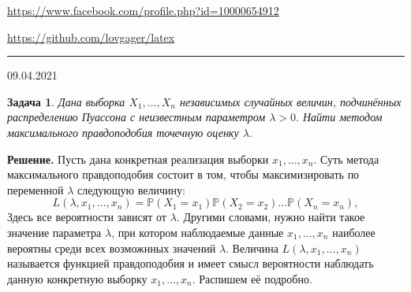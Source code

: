 \documentclass[12pt]{article}
\begin{document}


\begin{flushleft}
\url{https://www.facebook.com/profile.php?id=10000654912}

\url{https://github.com/lovgager/latex}
\end{flushleft}
\hrule 
\begin{flushright}
09.04.2021
\end{flushright}
\bigskip


\newtheorem*{task}{Задача}
\begin{task}
Дана выборка $X_1, ..., X_n$ независимых случайных величин, подчинённых распределению Пуассона с неизвестным параметром $\lambda > 0.$ Найти методом максимального правдоподобия точечную оценку $\lambda$. 
\end{task}

\noindent\textbf{Решение.} 
Пусть дана конкретная реализация выборки $x_1, ..., x_n.$ Суть метода максимального правдоподобия состоит в том, чтобы максимизировать по переменной $\lambda$ следующую величину:
\begin{equation*}
    L(\lambda, x_1, ..., x_n) = \mathbb{P}(X_1=x_1)\mathbb{P}(X_2=x_2)... \mathbb{P}(X_n = x_n),
\end{equation*}
Здесь все вероятности зависят от $\lambda.$ Другими словами, нужно найти такое значение параметра $\lambda$, при котором наблюдаемые данные $x_1, ..., x_n$ наиболее вероятны среди всех возможнных значений $\lambda$. Величина $L(\lambda, x_1, ..., x_n)$ называется функцией правдоподобия и имеет смысл вероятности наблюдать данную конкретную выборку $x_1, ..., x_n.$ Распишем её подробно.
\end{document}
